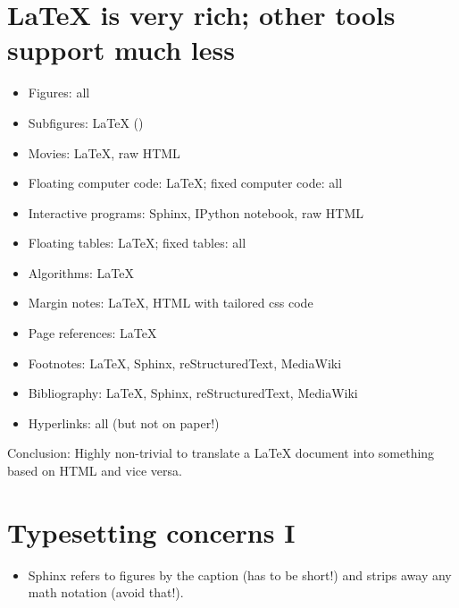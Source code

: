 \documentclass[%
twoside,                 %
draft,                   %
final,                   %
chapterprefix=true,      %
open=right               %
10pt]{book}
\begin{document}
\begin{shadedquoteBlue}
\begin{itemize}
\noindent
\end{itemize}

\noindent
\section*{{\LaTeX} is very rich; other tools support much less}

\begin{itemize}
 \item Figures: all

 \item Subfigures: {\LaTeX} ()

 \item Movies: {\LaTeX}, raw HTML

 \item Floating computer code: {\LaTeX}; fixed computer code: all

 \item Interactive programs: Sphinx, IPython notebook, raw HTML

 \item Floating tables: {\LaTeX}; fixed tables: all

 \item Algorithms: {\LaTeX}

 \item Margin notes: {\LaTeX}, HTML with tailored css code

 \item Page references: {\LaTeX}

 \item Footnotes: {\LaTeX}, Sphinx, reStructuredText, MediaWiki

 \item Bibliography: {\LaTeX}, Sphinx, reStructuredText, MediaWiki

 \item Hyperlinks: all (but not on paper!)
\end{itemize}

\noindent

Conclusion: Highly non-trivial to translate a {\LaTeX} document into something
based on HTML and vice versa.

\section*{Typesetting concerns I}

\begin{itemize}
 \item Sphinx refers to figures by the caption (has to be short!) and
   strips away any math notation (avoid that!).


\end{itemize}
\end{shadedquoteBlue}
\end{document}

